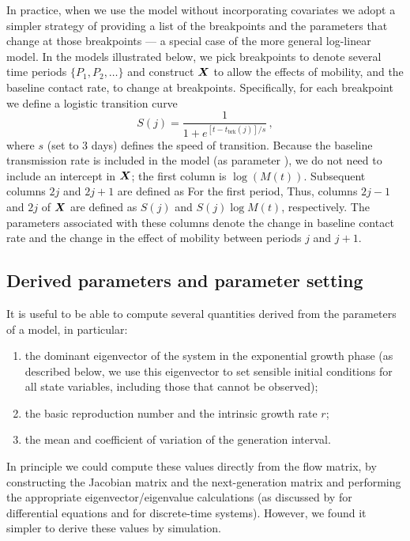 \documentclass[12pt]{article}\usepackage[]{graphicx}\usepackage[]{color}
\begin{document}
In practice, when we use the model without incorporating covariates we adopt a simpler strategy of providing a list of the breakpoints and the parameters that change at those breakpoints --- a special case of the more general log-linear model. In the models illustrated below, we pick breakpoints to denote several time periods $\{P_1, P_2, \ldots\}$ and construct $\boldsymbol{X}$ to allow the effects of mobility, and the baseline contact rate, to change at breakpoints.
Specifically, for each breakpoint we define a logistic transition curve 
\begin{equation}
S(j) = \frac{1}{1+e^{[t-t_\textrm{brk}(j)]/s}} \,,
\end{equation}
where $s$ (set to 3 days) defines the speed of transition. Because the baseline transmission rate is included in the model (as parameter ), we do not need to include an intercept in $\boldsymbol{X}$; the first column is $\log(M(t))$. Subsequent columns $2j$ and $2j+1$ are defined as
For the first period, 
Thus, columns $2j-1$ and $2j$ of $\boldsymbol{X}$ are defined as $S(j)$ and $S(j) \log M(t)$, respectively. The parameters associated with these columns denote the change in baseline contact rate and the change in the effect of mobility between periods $j$ and $j+1$.
  
\subsection*{Derived parameters and parameter setting}

It is useful to be able to compute several quantities derived from the parameters of a model, in particular:
\begin{enumerate}
\item the dominant eigenvector of the system in the exponential growth phase
  (as described below, we use this eigenvector to set sensible initial conditions for all state variables, including those that cannot be observed);
\item the basic reproduction number \Rzero and the intrinsic growth rate $r$;
\item the mean and coefficient of variation of the generation interval. 
\end{enumerate}
In principle we could compute these values directly from the flow matrix, by constructing the Jacobian matrix and the next-generation matrix and performing the appropriate eigenvector/eigenvalue calculations (as discussed by \cite{VandWatm02} for differential equations and \cite{Casw00} for discrete-time systems). However, we found it simpler to derive these values by simulation.
\end{document}
